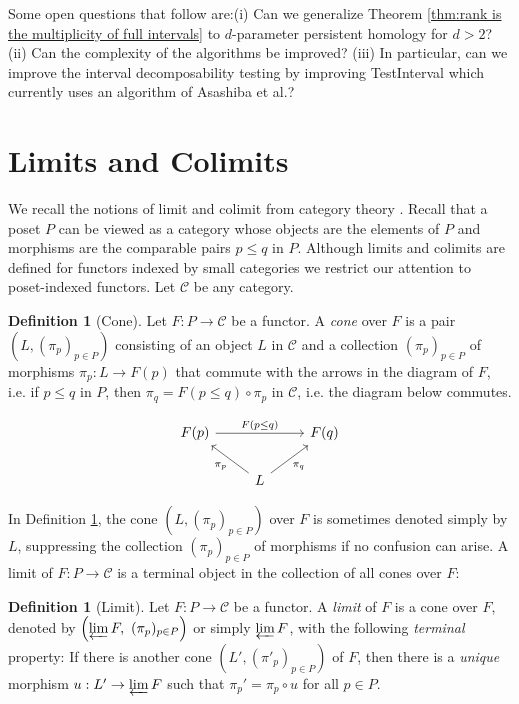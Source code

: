 \documentclass[11pt]{article}
\theoremstyle{definition}
\newtheorem{definition}[theorem]{Definition}
\newcommand{\Pb}{P}
\newcommand{\C}{\mathcal{C}}
\begin{document}
Some open questions that follow are:(i) Can we generalize Theorem \ref{thm:rank is the multiplicity of full intervals} to $d$-parameter persistent homology for $d>2$? (ii) Can the complexity of the algorithms be improved? (iii) In particular, can we improve the interval decomposability testing by improving {\sc TestInterval} which currently uses an algorithm of Asashiba et al.?

\appendix

\section{Limits and Colimits}\label{sec:limits and colimits}

We recall the notions of limit and colimit from category theory \cite{mac2013categories}. Recall that a poset $\Pb$ can be viewed as a category whose objects are the elements of $\Pb$ and morphisms are the comparable pairs $p\leq q$ in $\Pb$. Although limits and colimits are defined for functors indexed by small categories we restrict our attention to poset-indexed functors. Let $\C$ be any category.  
\begin{definition}[Cone]\label{def:cone} Let $F:\Pb\rightarrow \C$ be a functor. A \emph{cone} over $F$ is a pair $\left(L,(\pi_p)_{p\in \Pb}\right)$ consisting of an object $L$ in $\C$ and a collection $(\pi_p)_{p\in \Pb}$ of morphisms $\pi_p:L \rightarrow F(p)$ that commute with the arrows in the diagram of $F$, i.e. if $p\leq q$ in $\Pb$, then $\pi_q= F(p\leq q)\circ \pi_p$ in $\C$, i.e. the diagram below commutes.
\end{definition}
\begin{equation}\label{eq:cone commutativity}
    \begin{tikzcd}F(p)\arrow{rr}{F(p\leq q)}&&F(q)\\
& L \arrow{lu}{\pi_p} \arrow{ru}[swap]{\pi_q}\end{tikzcd}
\end{equation}

In Definition \ref{def:cone}, the cone $\left(L,(\pi_p)_{p\in \Pb}\right)$ over $F$ is sometimes denoted simply by $L$, suppressing the collection $(\pi_p)_{p\in \Pb}$ of morphisms if no confusion can arise. A limit of $F:\Pb\rightarrow \C$ is a terminal object in the collection of all cones over $F$: 


\begin{definition}[Limit]\label{def:limit} Let $F:\Pb\rightarrow \C$ be a functor. A \emph{limit} of $F$ is a cone over $F$, denoted by $\left(\varprojlim F,\ (\pi_p)_{p\in \Pb} \right)$ or simply $\varprojlim F$, with the following \emph{terminal} property: If there is another cone $\left(L',(\pi'_p)_{p\in \Pb} \right)$ of $F$, then there is a \emph{unique} morphism $u:L'\rightarrow \varprojlim F$ such that $\pi_p'=\pi_p\circ u$ for all $p\in \Pb$.
\end{definition}
\end{document}
